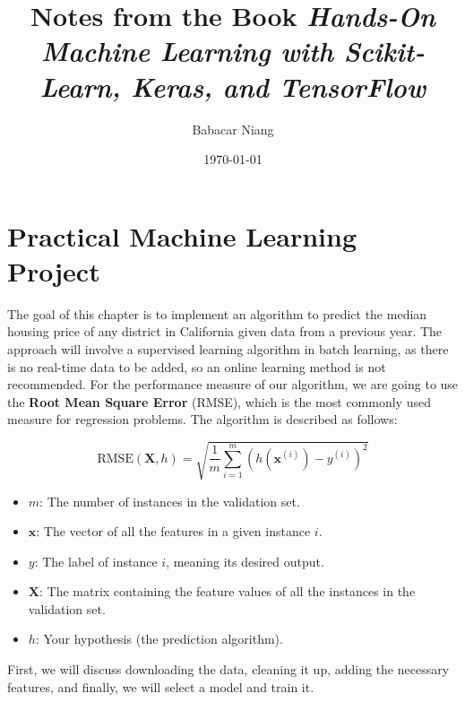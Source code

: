 \documentclass{article}
\title{Notes from the Book \textit{Hands-On Machine Learning with Scikit-Learn, Keras, and TensorFlow}}
\author{Babacar Niang}
\date{\today}
\begin{document}
\maketitle
\clearpage

\section{Practical Machine Learning Project}

The goal of this chapter is to implement an algorithm to predict the median housing price of any district in California given data from a 
previous year. The approach will involve a supervised learning algorithm in batch learning, as there is no real-time data to be added, so an 
online learning method is not recommended. For the performance measure of our algorithm, we are going to use the \textbf{Root Mean Square Error} (RMSE), which is the most commonly used measure for regression problems. The algorithm is described as follows:

\begin{equation}
\mathrm{RMSE} (\mathbf{X}, h) = \sqrt{ \frac{1}{m} \sum_{i=1}^{m} \left( h\left( \mathbf{x}^{(i)} \right) - y^{(i)} \right)^2}
\end{equation}

\begin{itemize}
    \item $m$: The number of instances in the validation set.
    \item $\mathbf{x}$: The vector of all the features in a given instance $i$.
    \item $y$: The label of instance $i$, meaning its desired output.
    \item $\mathbf{X}$: The matrix containing the feature values of all the instances in the validation set.
    \item $h$: Your hypothesis (the prediction algorithm).
\end{itemize}

First, we will discuss downloading the data, cleaning it up, adding the necessary features, and finally, we will select a model and train it.
\end{document}
